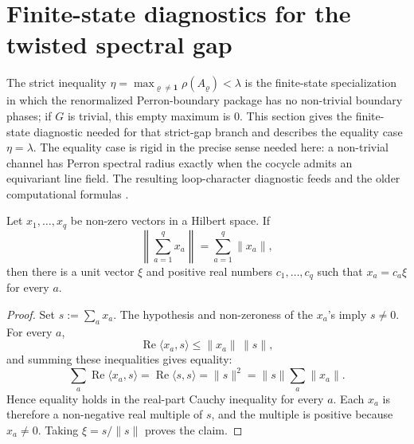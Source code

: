 \section{Finite-state diagnostics for the twisted spectral gap}
\label{sec:eta-gap}

The strict inequality
\(\eta=\max_{\varrho\neq\mathbf 1}\rho(A_\varrho)<\lambda\) is the
finite-state specialization in which the renormalized Perron-boundary package
has no non-trivial boundary phases; if \(G\) is trivial, this empty maximum is
\(0\).  This section gives the finite-state diagnostic needed for that
strict-gap branch and describes the equality case \(\eta=\lambda\).  The equality case is rigid
in the precise sense needed here: a non-trivial channel has Perron spectral
radius exactly when the cocycle admits an equivariant line field.  The resulting
loop-character diagnostic feeds  and the older
computational formulas
.

\begin{lemma}
  \label{lem:hilbert-triangle-equality}
  Let \(x_1,\ldots,x_q\) be non-zero vectors in a Hilbert space.  If
  \[
    \left\|\sum_{a=1}^q x_a\right\|=\sum_{a=1}^q\|x_a\|,
  \]
  then there is a unit vector \(\xi\) and positive real numbers
  \(c_1,\ldots,c_q\) such that \(x_a=c_a\xi\) for every \(a\).
\end{lemma}

\begin{proof}
  Set \(s:=\sum_a x_a\).  The hypothesis and non-zeroness of the \(x_a\)'s
  imply \(s\neq0\).  For every \(a\),
  \[
    \operatorname{Re}\langle x_a,s\rangle\le \|x_a\|\,\|s\|,
  \]
  and summing these inequalities gives equality:
  \[
    \sum_a\operatorname{Re}\langle x_a,s\rangle
    =
    \operatorname{Re}\langle s,s\rangle
    =
    \|s\|^2
    =
    \|s\|\sum_a\|x_a\|.
  \]
  Hence equality holds in the real-part Cauchy inequality for every \(a\).
  Each \(x_a\) is therefore a non-negative real multiple of \(s\), and the
  multiple is positive because \(x_a\neq0\).  Taking
  \(\xi=s/\|s\|\) proves the claim.
\end{proof}

